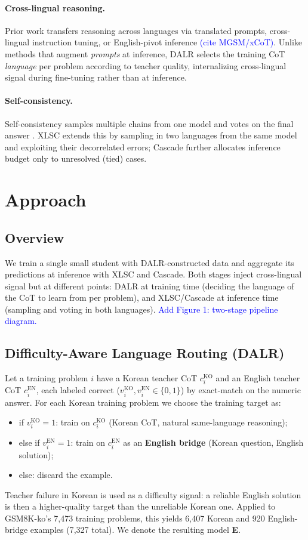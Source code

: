 \documentclass{article}
\newcommand{\note}[1]{\textcolor{blue}{{#1}}}
\begin{document}
\paragraph{Cross-lingual reasoning.}
Prior work transfers reasoning across languages via translated prompts,
cross-lingual instruction tuning, or English-pivot inference
\note{(cite MGSM/xCoT)}. Unlike methods that augment \emph{prompts} at
inference, DALR selects the training CoT \emph{language} per problem
according to teacher quality, internalizing cross-lingual signal during
fine-tuning rather than at inference.

\paragraph{Self-consistency.}
Self-consistency samples multiple chains from one model and votes on
the final answer \citep{wang2022selfconsistency}. XLSC extends this by
sampling in two languages from the same model and exploiting their
decorrelated errors; Cascade further allocates inference budget only to
unresolved (tied) cases.

\section{Approach}
\subsection{Overview}
We train a single small student with DALR-constructed data and aggregate
its predictions at inference with XLSC and Cascade. Both stages inject
cross-lingual signal but at different points: DALR at training time
(deciding the language of the CoT to learn from per problem), and
XLSC/Cascade at inference time (sampling and voting in both languages).
\note{Add Figure 1: two-stage pipeline diagram.}

\subsection{Difficulty-Aware Language Routing (DALR)}
\label{sec:dalr}
Let a training problem $i$ have a Korean teacher CoT $c_i^{\text{KO}}$
and an English teacher CoT $c_i^{\text{EN}}$, each labeled correct
($v_i^{\text{KO}}, v_i^{\text{EN}} \in \{0,1\}$) by exact-match on the
numeric answer. For each Korean training problem we choose the
training target as:
\begin{itemize}
  \item if $v_i^{\text{KO}} = 1$: train on $c_i^{\text{KO}}$
  (Korean CoT, natural same-language reasoning);
  \item else if $v_i^{\text{EN}} = 1$: train on $c_i^{\text{EN}}$ as an
  \textbf{English bridge} (Korean question, English solution);
  \item else: discard the example.
\end{itemize}
Teacher failure in Korean is used as a difficulty signal: a reliable
English solution is then a higher-quality target than the unreliable
Korean one. Applied to GSM8K-ko's 7{,}473 training problems, this yields
6{,}407 Korean and 920 English-bridge examples (7{,}327 total). We
denote the resulting model \textbf{E}.
\end{document}
